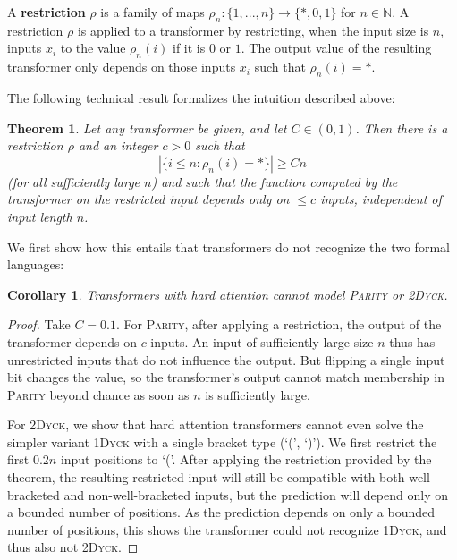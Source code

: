 \documentclass[11pt,a4paper]{article}
\newcounter{theorem}
\newtheorem{corollary}[theorem]{Corollary}
\newtheorem{thm}[theorem]{Theorem}
\newcommand{\key}[1]{\textbf{#1}}
\begin{document}
A \key{restriction} $\rho$ is a family of maps $\rho_n : \{1, ..., n\} \rightarrow \{*, 0, 1\}$ for $n \in \mathbb{N}$.
A restriction $\rho$ is applied to a transformer by restricting, when the input size is $n$, inputs $x_i$ to the value $\rho_n(i)$ if it is $0$ or $1$.
The output value of the resulting transformer only depends on those inputs $x_i$ such that $\rho_n(i) = *$.

The following technical result formalizes the intuition described above:
\begin{thm}\label{thm:hardmax-main}
Let any transformer be given, and let $C \in (0,1)$.
Then there is a restriction $\rho$ and an integer $c > 0$ such that 
$$|\{i \leq n: \rho_n(i) = *\}| \geq Cn$$
(for all sufficiently large $n$) and such that the function computed by the transformer on the restricted input depends only on $\leq c$ inputs, independent of input length $n$.
\end{thm}
We first show how this entails that transformers do not recognize the two formal languages:
\begin{corollary}
Transformers with hard attention cannot model \textsc{Parity} or \textsc{2Dyck}. %
\end{corollary}
\begin{proof}
Take $C=0.1$.
For \textsc{Parity}, after applying a restriction, the output of the transformer depends on $c$ inputs.
An input of sufficiently large size $n$ thus has unrestricted inputs that do not influence the output.
But flipping a single input bit changes the value, so the transformer's output cannot match membership in \textsc{Parity} beyond chance as soon as $n$ is sufficiently large.


For \textsc{2Dyck}, we show that hard attention transformers cannot even solve the simpler variant \textsc{1Dyck} with a single bracket type (`(', `)').
We first restrict the first $0.2n$ input positions to `('.
After applying the restriction provided by the theorem, the resulting restricted input will still be compatible with both well-bracketed and non-well-bracketed inputs, but the prediction will depend only on a bounded number of positions.
As the prediction depends on only a bounded number of positions, this shows the transformer could not recognize \textsc{1Dyck}, and thus also not \textsc{2Dyck}.
%
\end{proof}
\end{document}
